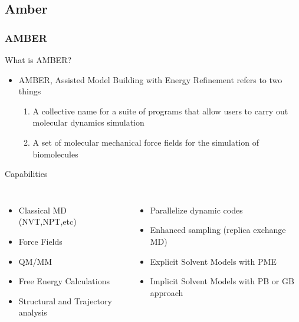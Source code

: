 \documentclass[slidestop,mathserif,compress,xcolor=svgnames]{beamer}
\newenvironment{bblock}[0]
{
\begin{beamerboxesrounded}[upper=uppercol1,lower=lowercol1,shadow=true]}
{\end{beamerboxesrounded}}
\begin{document}
\subsection{Amber}
\begin{frame}
  \frametitle{\small AMBER}
  \begin{bblock}{What is AMBER?}
    \begin{itemize}
      \item AMBER, Assisted Model Building with Energy Refinement refers to two things
      \begin{enumerate}
	\item A collective name for a suite of programs that allow users to carry out molecular dynamics simulation
	\item A set of molecular mechanical force fields for the simulation of biomolecules
      \end{enumerate}
    \end{itemize}
  \end{bblock}
  \begin{bblock}{Capabilities}
    \begin{columns}
      \begin{itemize}
	\item Classical MD (NVT,NPT,etc)
	\item Force Fields
	\item QM/MM
	\item Free Energy Calculations
	\item Structural and Trajectory analysis
      \end{itemize}
      \begin{itemize}
	\item Parallelize dynamic codes
	\item Enhanced sampling (replica exchange MD)
	\item Explicit Solvent Models with PME
	\item Implicit Solvent Models with PB or GB approach
      \end{itemize}
    \end{columns}
  \end{bblock}
\end{frame}
\end{document}
